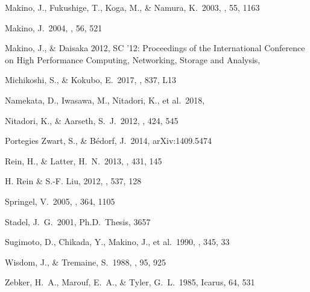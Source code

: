 \documentclass[dvipdfmx]{pasj01}
\newcommand{\icarus}{Icarus}
\begin{document}
\begin{thebibliography}{}
 Makino, J., Fukushige, T., Koga, M., \& Namura, K.\ 2003, \pasj, 55, 1163 
  
 Makino, J.\ 2004, \pasj, 56, 521

 Makino, J., \& Daisaka 2012, SC '12: Proceedings of the International Conference on High Performance Computing, Networking, Storage and Analysis, 
  
 Michikoshi, S., \& Kokubo, E.\ 2017, \apjl, 837, L13

 Namekata, D., Iwasawa, M., Nitadori, K., et al.\ 2018, \pasj
  
 Nitadori, K., \& Aarseth, S.~J.\ 2012, \mnras, 424, 545 
  
 Portegies Zwart, S., \& B{\'e}dorf, J.\ 2014, arXiv:1409.5474
  
 Rein, H., \& Latter, H.~N.\ 2013, \mnras, 431, 145

 H. {Rein} \& S.-F. {Liu}, 2012, \aap, 537, 128

 Springel, V.\ 2005, \mnras, 364, 1105 
  
 Stadel, J.~G.\ 2001, Ph.D.~Thesis, 3657

 Sugimoto, D., Chikada, Y., Makino, J., et al.\ 1990, \nat, 345, 33 
  
 Wisdom, J., \& Tremaine, S.\ 1988, \aj, 95, 925
  
 Zebker, H.~A., Marouf, E.~A., \& Tyler, G.~L.\ 1985, \icarus, 64, 531

\end{thebibliography}
  
\end{document}
